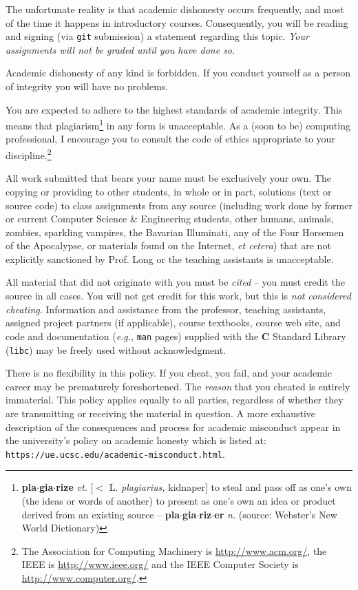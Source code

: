 \documentclass{article}
\begin{document}
The unfortunate reality is that academic dishonesty occurs frequently, and most
of the time it happens in introductory courses. Consequently, you will be
reading and signing (via \texttt{git} submission) a statement regarding this
topic. \emph{Your assignments will not be graded until you have done so.}

Academic dishonesty of any kind is forbidden. If you conduct yourself as a
person of integrity you will have no problems.

You are expected to adhere to the highest standards of academic
integrity.
This means that plagiarism\footnote{{\bf pla$\cdot$gia$\cdot$rize} {\em vt.}
[$<$ L. {\em plagiarius,} kidnaper] to steal and pass off as one's own
(the ideas or words of another) to present as one's own an idea or product
derived from an existing source -- {\bf pla$\cdot$gia$\cdot$riz$\cdot$er}
{\em n.} (source: Webster's New World Dictionary)}
in any form is unacceptable.
As a (soon to be) computing
professional, I encourage you to consult the code of ethics
appropriate to your discipline.\footnote{The Association for Computing Machinery
is \url{http://www.acm.org/}, the IEEE is
\url{http://www.ieee.org/} and the IEEE Computer
Society is \url{http://www.computer.org/}.}

All work submitted that bears your name must be exclusively your own. 
The copying or providing to other students, in whole or in part,
solutions (text or source code) to class assignments from any source
(including work done by former or current Computer Science \& Engineering students,
other humans, animals, zombies, sparkling vampires, the Bavarian Illuminati,
any of the Four Horsemen of the Apocalypse, or materials found
on the Internet, \emph{et cetera}) that are not explicitly sanctioned by
Prof.\xspace Long or the teaching assistants is unacceptable.

All material that did not originate with you must be \emph{cited}
-- you must credit the source in all cases. You will not get credit
for this work, but this is \emph{not considered cheating}. Information and 
assistance from the professor, teaching assistants, assigned project partners (if applicable), 
course textbooks, course web site, and code and documentation 
(\emph{e.g.}, \texttt{man} pages) supplied with the \textbf{C} Standard Library 
(\texttt{libc}) may be freely used without acknowledgment.

There is no flexibility in this policy. If you cheat, you fail, and
your academic career may be prematurely foreshortened. The
\emph{reason} that you cheated is entirely immaterial. This policy
applies equally to all parties, regardless of whether they are
transmitting or receiving the material in question. A more exhaustive description 
of the consequences and process for academic misconduct
appear in the university's policy on academic honesty which is listed at: \texttt{https://ue.ucsc.edu/academic-misconduct.html}. 
\end{document}
